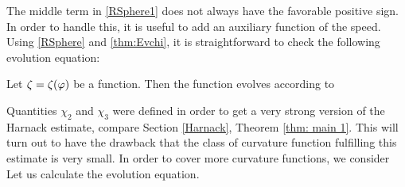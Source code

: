 \documentclass{amsart}
\begin{document}

The middle term in \cref{RSphere1} does not always have the favorable positive sign. In order to handle this, it is useful to add an auxiliary function of the speed. Using \cref{RSphere} and  \cref{thm:Evchi}, it is straightforward to check the following evolution equation:

\begin{lemma}
Let $\zeta=\zeta(\varphi)$ be a function. Then the function
evolves according to
\end{lemma}

Quantities $\chi_2$ and $\chi_3$ were defined
in order to get a very strong version of the Harnack estimate, compare Section \ref{Harnack}, Theorem \ref{thm: main 1}. This will turn out to have the drawback that the class of curvature function fulfilling this estimate is very small. In order to cover more curvature functions, we consider
Let us calculate the evolution equation.
\end{document}
